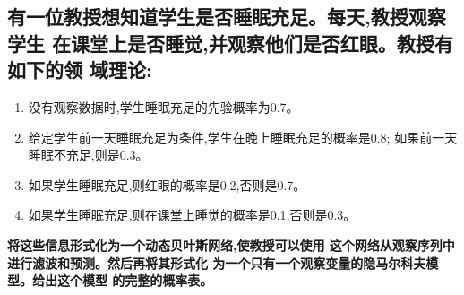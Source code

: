 \documentclass[UTF8]{ctexart}
\begin{document}
\subsection{有一位教授想知道学生是否睡眠充足。每天,教授观察学生
在课堂上是否睡觉,并观察他们是否红眼。教授有如下的领
域理论:}
\begin{enumerate}[1)]
    \item 没有观察数据时,学生睡眠充足的先验概率为0.7。
    \item 给定学生前一天睡眠充足为条件,学生在晚上睡眠充足的概率是0.8;
    如果前一天睡眠不充足,则是0.3。
    \item 如果学生睡眠充足,则红眼的概率是0.2,否则是0.7。
    \item 如果学生睡眠充足,则在课堂上睡觉的概率是0.1,否则是0.3。
\end{enumerate}
\phantom{空格}\textbf{将这些信息形式化为一个动态贝叶斯网络,使教授可以使用
这个网络从观察序列中进行滤波和预测。然后再将其形式化
为一个只有一个观察变量的隐马尔科夫模型。给出这个模型
的完整的概率表。}
\end{document}
